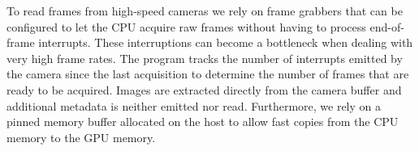 To read frames from high-speed cameras we rely on frame grabbers that can be configured to let the CPU acquire raw frames without having to process end-of-frame interrupts. These interruptions can become a bottleneck when dealing with very high frame rates. The program tracks the number of interrupts emitted by the camera since the last acquisition to determine the number of frames that are ready to be acquired. Images are extracted directly from the camera buffer and additional metadata is neither emitted nor read. Furthermore, we rely on a pinned memory buffer allocated on the host to allow fast copies from the CPU memory to the GPU memory.